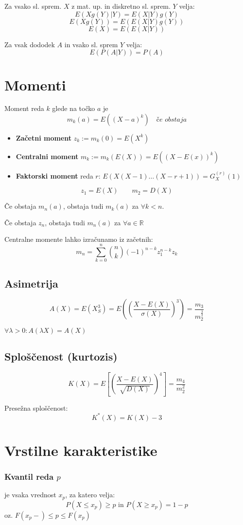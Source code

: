 \begin{multicols}{5}
Za vsako sl. sprem. $X$ z mat. up. in diskretno sl. sprem. $Y$ velja:
\[ E(Xg(Y) | Y) = E(X | Y)g(Y) \]
\[ E(Xg(Y)) = E(E(X | Y)g(Y)) \]
\[ E(X) = E(E(X|Y))\]

Za vsak dododek $A$ in vsako sl. sprem $Y$ velja:
\[ E(P(A|Y)) = P(A)\]


\section{Momenti}
Moment reda $k$ glede na točko $a$ je
\[ m_k(a) = E((X-a)^k) \quad \textit{če obstaja}\]

\begin{itemize}
	\item \textbf{Začetni moment} $z_k := m_k(0) = E(X^k)$
	\item \textbf{Centralni moment} $m_k := m_k(E(X)) = E((X-E(x))^k)$
	\item \textbf{Faktorski moment} reda $r$: $E(X(X-1)\dots (X-r+1)) = G_X^{(r)}(1)$
\end{itemize}

\[ z_1 = E(X) \qquad m_2 = D(X)\]

Če obstaja $m_n(a)$, obstaja tudi $m_k(a)$ za $\forall k < n$.

Če obstaja $z_n$, obstaja tudi $m_n(a)$ za $\forall a \in \mathbb{R}$

Centralne momente lahko izračunamo iz začetnih:
\[ m_n = \sum_{k=0}^n \binom{n}{k} (-1)^{n-k} z_1^{n-k} z_k \]

\subsection{Asimetrija}
\[A(X) = E(X_S^3) = E\left( (\frac{X-E(X)}{\sigma(X)})^3 \right) = \frac{m_3}{m_2^{\frac{3}{2}}}\]

$\forall \lambda > 0: A(\lambda X) = A(X)$

\subsection{Sploščenost (kurtozis)}
\[ K(X) = E\left[ \left( \frac{X-E(X)}{\sqrt{D(X)}}\right)^4\right] = \frac{m_4}{m_2^2}\]

Presežna sploščenost:
\[ K^*(X) = K(X) - 3\]

\section{Vrstilne karakteristike}

\subsubsection{Kvantil reda $p$}
je vsaka vrednost $x_p$, za katero velja:
\[ P(X \leq x_p) \geq p \text{ in } P(X \geq x_p) = 1 - p \]
oz. $F(x_p-) \leq p \leq F(x_p)$


\end{multicols}
